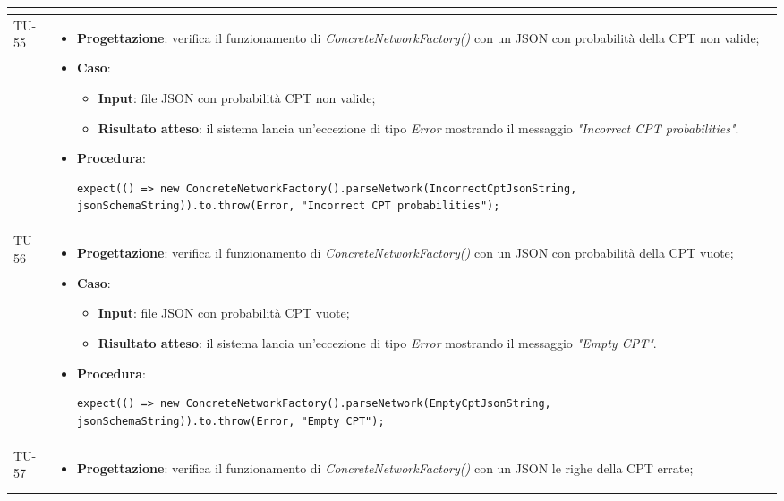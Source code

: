 \begin{longtable}{|C{1.5cm}|C{14.5cm}|}
\begin{itemize}
	\end{itemize}\\
	\hline
	{TU-55} &
	\begin{itemize}
		\item \textbf{Progettazione}: verifica il funzionamento di \emph{ConcreteNetworkFactory()} con un JSON con probabilità della CPT non valide;
		\item \textbf{Caso}: 
		\begin{itemize}
			\item \textbf{Input}: file JSON con probabilità CPT non valide;
			\item \textbf{Risultato atteso}: il sistema lancia un'eccezione di tipo \emph{Error} mostrando il messaggio \emph{"Incorrect CPT probabilities"}.
		\end{itemize}
		\item \textbf{Procedura}:
		\begin{lstlisting}
expect(() => new ConcreteNetworkFactory().parseNetwork(IncorrectCptJsonString, jsonSchemaString)).to.throw(Error, "Incorrect CPT probabilities");
		\end{lstlisting}
	\end{itemize}\\
	\hline
	{TU-56} &
	\begin{itemize}
		\item \textbf{Progettazione}: verifica il funzionamento di \emph{ConcreteNetworkFactory()} con un JSON con probabilità della CPT vuote;
		\item \textbf{Caso}: 
		\begin{itemize}
			\item \textbf{Input}: file JSON con probabilità CPT vuote;
			\item \textbf{Risultato atteso}: il sistema lancia un'eccezione di tipo \emph{Error} mostrando il messaggio \emph{"Empty CPT"}.
		\end{itemize}
		\item \textbf{Procedura}:
		\begin{lstlisting}
expect(() => new ConcreteNetworkFactory().parseNetwork(EmptyCptJsonString, jsonSchemaString)).to.throw(Error, "Empty CPT");
		\end{lstlisting}
	\end{itemize}\\
	\hline
	{TU-57} &
	\begin{itemize}
		\item \textbf{Progettazione}: verifica il funzionamento di \emph{ConcreteNetworkFactory()} con un JSON le righe della CPT errate;

\end{itemize}
\end{longtable}
